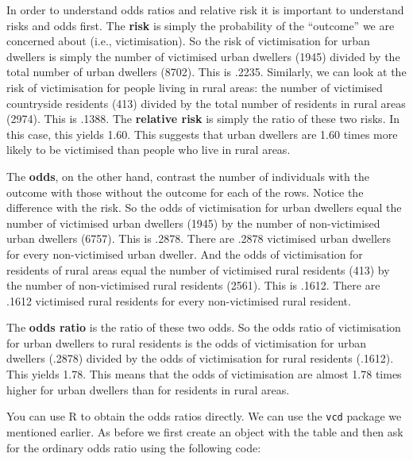 \documentclass[
]{book}
\newenvironment{Shaded}{\begin{snugshade}}{\end{snugshade}}
\newcommand{\AttributeTok}[1]{\textcolor[rgb]{0.13,0.29,0.53}{#1}}
\newcommand{\ConstantTok}[1]{\textcolor[rgb]{0.56,0.35,0.01}{#1}}
\newcommand{\FloatTok}[1]{\textcolor[rgb]{0.00,0.00,0.81}{#1}}
\newcommand{\FunctionTok}[1]{\textcolor[rgb]{0.13,0.29,0.53}{\textbf{#1}}}
\newcommand{\NormalTok}[1]{#1}
\newcommand{\OtherTok}[1]{\textcolor[rgb]{0.56,0.35,0.01}{#1}}
\newcommand{\SpecialCharTok}[1]{\textcolor[rgb]{0.81,0.36,0.00}{\textbf{#1}}}
\begin{document}
In order to understand odds ratios and relative risk it is important to understand risks and odds first. The \textbf{risk} is simply the probability of the ``outcome'' we are concerned about (i.e., victimisation). So the risk of victimisation for urban dwellers is simply the number of victimised urban dwellers (1945) divided by the total number of urban dwellers (8702). This is .2235. Similarly, we can look at the risk of victimisation for people living in rural areas: the number of victimised countryside residents (413) divided by the total number of residents in rural areas (2974). This is .1388. The \textbf{relative risk} is simply the ratio of these two risks. In this case, this yields 1.60. This suggests that urban dwellers are 1.60 times more likely to be victimised than people who live in rural areas.

The \textbf{odds}, on the other hand, contrast the number of individuals with the outcome with those without the outcome for each of the rows. Notice the difference with the risk. So the odds of victimisation for urban dwellers equal the number of victimised urban dwellers (1945) by the number of non-victimised urban dwellers (6757). This is .2878. There are .2878 victimised urban dwellers for every non-victimised urban dweller. And the odds of victimisation for residents of rural areas equal the number of victimised rural residents (413) by the number of non-victimised rural residents (2561). This is .1612. There are .1612 victimised rural residents for every non-victimised rural resident.

The \textbf{odds ratio} is the ratio of these two odds. So the odds ratio of victimisation for urban dwellers to rural residents is the odds of victimisation for urban dwellers (.2878) divided by the odds of victimisation for rural residents (.1612). This yields 1.78. This means that the odds of victimisation are almost 1.78 times higher for urban dwellers than for residents in rural areas.

You can use R to obtain the odds ratios directly. We can use the \texttt{vcd} package we mentioned earlier. As before we first create an object with the table and then ask for the ordinary odds ratio using the following code:

\begin{Shaded}
\end{Shaded}
\end{document}
